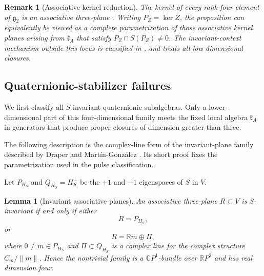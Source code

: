 \documentclass[11pt,a4paper]{article}
\newtheorem{lemma}[lemma]{Lemma}
\newtheorem{remark}[remark]{Remark}
\newcommand{\RR}{\mathbb R}
\newcommand{\CC}{\mathbb C}
\begin{document}
\begin{remark}[Associative kernel reduction]
The kernel of every rank-four element of $\mathfrak g_2$ is an associative three-plane \cite{ChemtovKarigiannis2022}.  Writing $P_Z=\ker Z$, the proposition can equivalently be viewed as a complete parametrization of those associative kernel planes arising from $\mathfrak k_A$ that satisfy $P_Z\cap S(P_Z)\ne0$.  The invariant-context mechanism outside this locus is classified in , and  treats all low-dimensional closures.
\end{remark}

\subsection{Quaternionic-stabilizer failures}
We first classify all $S$-invariant quaternionic subalgebras.  Only a lower-dimensional part of this four-dimensional family meets the fixed local algebra $\mathfrak k_A$ in generators that produce proper closures of dimension greater than three.

The following description is the complex-line form of the invariant-plane family described by Draper and Mart\'in-Gonz\'alez \cite{DraperMartin2025}.  Its short proof fixes the parametrization used in the pulse classification.

Let $P_{H_S}$ and $Q_{H_S}=H_S^\perp$ be the $+1$ and $-1$ eigenspaces of $S$ in $V$.  

\begin{lemma}[Invariant associative planes]
\label{thm:invariant-contexts}
An associative three-plane $R\subset V$ is $S$-invariant if and only if either
\[
R=P_{H_S},
\]
or
\[
R=\RR m\oplus\Pi,
\]
where $0\ne m\in P_{H_S}$ and $\Pi\subset Q_{H_S}$ is a complex line for the complex structure $C_m/\lVert m\rVert$.  Hence the nontrivial family is a $\CC P^1$-bundle over $\RR P^2$ and has real dimension four.
\end{lemma}
\end{document}
